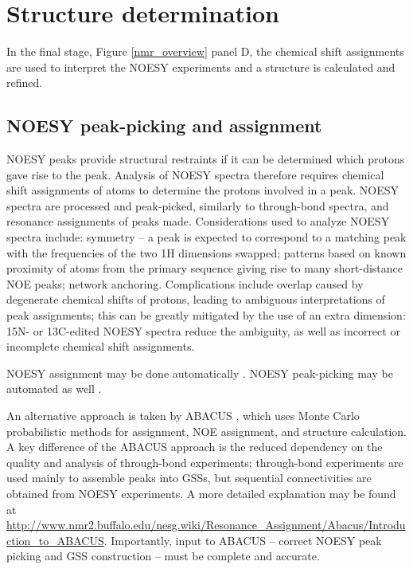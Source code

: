 \section{Structure determination}

In the final stage, Figure \ref{nmr_overview} panel D, the chemical shift 
assignments are used to interpret the NOESY experiments and a structure
is calculated and refined.

\subsection*{NOESY peak-picking and assignment}
NOESY peaks provide structural restraints if it can be 
determined which protons gave rise to the peak.  Analysis of NOESY spectra 
therefore requires chemical shift assignments of atoms to 
determine the protons involved in a peak.  
NOESY spectra are  processed and peak-picked, similarly to through-bond 
spectra, and resonance assignments of peaks made.  
Considerations used to analyze 
NOESY spectra include: symmetry -- a peak is expected to correspond to a 
matching peak with the frequencies of the two 1H dimensions swapped; patterns 
based on known proximity of atoms from the primary sequence giving rise to 
many short-distance NOE peaks; network anchoring.  Complications include 
overlap caused by degenerate chemical shifts of protons, leading to 
ambiguous interpretations of peak assignments; this can be greatly mitigated 
by the use of an extra dimension:  15N- or 13C-edited NOESY spectra reduce 
the ambiguity, as well as incorrect or incomplete chemical shift assignments.

NOESY assignment may be done automatically \cite{cyana2004, aria2003}.  
NOESY peak-picking may be automated as well \cite{munin, korzhnev2001munin}.

An alternative approach is taken by ABACUS \cite{abacus_assignment}, which uses
Monte Carlo probabilistic methods for assignment, NOE assignment, and structure
calculation.  A key difference of the ABACUS approach is the reduced dependency
on the quality and analysis of through-bond experiments; through-bond experiments
are used mainly to assemble peaks into GSSs, but sequential connectivities are
obtained from NOESY experiments.  A more detailed explanation may be found at 
\url{http://www.nmr2.buffalo.edu/nesg.wiki/Resonance_Assignment/Abacus/Introduction_to_ABACUS}.
Importantly, input to ABACUS -- correct NOESY peak picking and GSS construction
-- must be complete and accurate.

